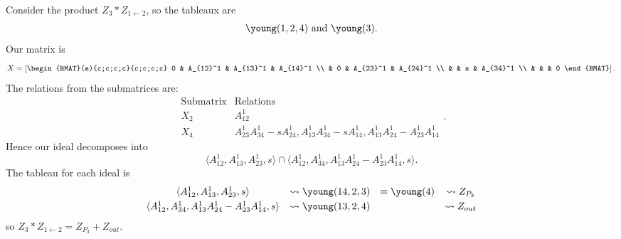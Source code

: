 \documentclass[draft]{article}
\begin{document}
\begin{example}
Consider the product $Z_3 * Z_{1 \leftarrow 2}$, so the tableaux are 
\[
\young(1,2,4) \text{ and } \young(3).
\]
Our matrix is 
\[
X = \left[\begin{BMAT}(e){c;c;c;c}{c;c;c;c}
    0 & A_{12}^1 & A_{13}^1 & A_{14}^1 \\
     & 0 & A_{23}^1 & A_{24}^1 \\
     & & s & A_{34}^1 \\
     & & & 0
\end{BMAT}
\right].
\]
The relations from the submatrices are:
\[
\begin{array}{c|c}
    \text{Submatrix} & \text{Relations} \\ \hline
    X_2 & A_{12}^1 \\
    X_4 & A_{23}^1A_{34}^1 - sA_{24}^1, A_{13}^1A_{34}^1 - sA_{14}^1, A_{13}^1A_{24}^1 - A_{23}^1A_{14}^1 
\end{array}.
\]
Hence our ideal decomposes into 
\[
\langle A_{12}^1,A_{13}^1,A_{23}^1,s \rangle \cap \langle A_{12}^1,A_{34}^1,A_{13}^1A_{24}^1-A_{23}^1A_{14}^1,s \rangle.
\]
The tableau for each ideal is
\[\begin{array}{cccc}\vspace{1mm}
    \langle A_{12}^1,A_{13}^1,A_{23}^1,s \rangle &\leadsto \young(14,2,3) &\equiv \young(4) &\leadsto Z_{P_3} \\ 
    \langle A_{12}^1,A_{34}^1,A_{13}^1A_{24}^1-A_{23}^1A_{14}^1,s \rangle &\leadsto \young(13,2,4) & &\leadsto Z_{out}
\end{array}
\]
so $Z_3 * Z_{1 \leftarrow 2} = Z_{P_3} + Z_{out}$.
\end{example}
\end{document}
